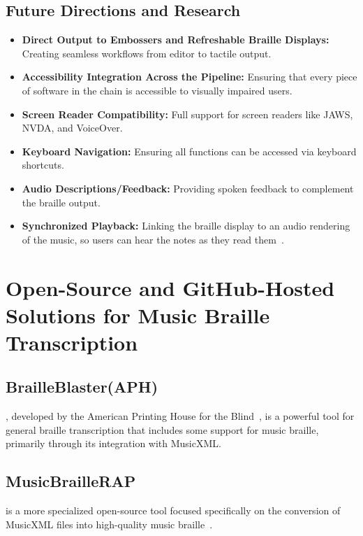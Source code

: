 \subsection{Future Directions and Research}\label{ch10:ssec:bmml-future-directions}
\begin{itemize}
	\item \textbf{Direct Output to Embossers and Refreshable Braille Displays:} Creating seamless workflows from editor to tactile output.
	\item \textbf{Accessibility Integration Across the Pipeline:} Ensuring that every piece of software in the chain is accessible to visually impaired users.
	\item \textbf{Screen Reader Compatibility:} Full support for screen readers like JAWS, NVDA, and VoiceOver.
	\item \textbf{Keyboard Navigation:} Ensuring all functions can be accessed via keyboard shortcuts.
	\item \textbf{Audio Descriptions/Feedback:} Providing spoken feedback to complement the braille output.
	\item \textbf{Synchronized Playback:} Linking the braille display to an audio rendering of the music, so users can hear the notes as they read them~\supercite{canasstech-limealoud}.
\end{itemize}

\section{Open-Source and GitHub-Hosted Solutions for Music Braille Transcription}\label{ch10:sec:open-source-solutions}

\subsection{BrailleBlaster(APH)}\label{ch10:ssec:brailleblaster}
, developed by the American Printing House for the Blind~\supercite{aph-brailleblaster}, is a powerful tool for general braille transcription that includes some support for music braille, primarily through its integration with \gls{MusicXML}.

\subsection{MusicBrailleRAP}\label{ch10:ssec:musicbraillerap}
 is a more specialized open-source tool focused specifically on the conversion of \gls{MusicXML} files into high-quality music braille~\supercite{musicbraillerap-github}.

